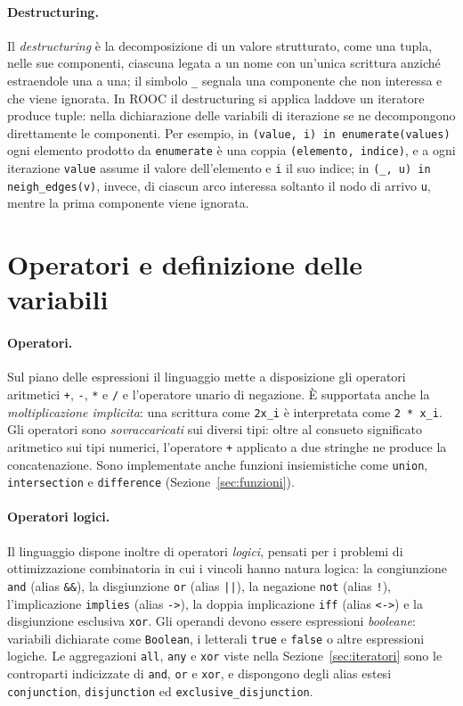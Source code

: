 \paragraph{Destructuring.}
Il \emph{destructuring} è la decomposizione di un valore strutturato, come una
tupla, nelle sue componenti, ciascuna legata a un nome con un'unica scrittura
anziché estraendole una a una; il simbolo \texttt{\_} segnala una componente che
non interessa e che viene ignorata. In ROOC il destructuring si applica laddove un
iteratore produce tuple: nella dichiarazione delle variabili di iterazione se ne
decompongono direttamente le componenti. Per esempio, in \texttt{(value, i) in
enumerate(values)} ogni elemento prodotto da \texttt{enumerate} è una coppia
\texttt{(elemento, indice)}, e a ogni iterazione \texttt{value} assume il valore
dell'elemento e \texttt{i} il suo indice; in \texttt{(\_, u) in neigh\_edges(v)},
invece, di ciascun arco interessa soltanto il nodo di arrivo \texttt{u}, mentre la
prima componente viene ignorata.

\section{Operatori e definizione delle variabili}
\label{sec:operatori-variabili}

\paragraph{Operatori.}
Sul piano delle espressioni il linguaggio mette a disposizione gli operatori
aritmetici \texttt{+}, \texttt{-}, \texttt{*} e \texttt{/} e l'operatore unario
di negazione. È supportata anche la \emph{moltiplicazione implicita}: una
scrittura come \texttt{2x\_i} è interpretata come \texttt{2 * x\_i}. Gli
operatori sono \emph{sovraccaricati} sui diversi tipi: oltre al consueto
significato aritmetico sui tipi numerici, l'operatore \texttt{+} applicato a due
stringhe ne produce la concatenazione. Sono implementate anche funzioni insiemistiche come
\texttt{union}, \texttt{intersection} e \texttt{difference}
(Sezione~\ref{sec:funzioni}).

\paragraph{Operatori logici.}
Il linguaggio dispone inoltre di operatori \emph{logici}, pensati per i problemi
di ottimizzazione combinatoria in cui i vincoli hanno natura logica: la
congiunzione \texttt{and} (alias \texttt{\&\&}), la disgiunzione \texttt{or}
(alias \texttt{||}), la negazione \texttt{not} (alias \texttt{!}),
l'implicazione \texttt{implies} (alias \texttt{->}), la doppia implicazione
\texttt{iff} (alias \texttt{<->}) e la disgiunzione esclusiva \texttt{xor}. Gli
operandi devono essere espressioni \emph{booleane}: variabili dichiarate come
\texttt{Boolean}, i letterali \texttt{true} e \texttt{false} o altre
espressioni logiche.
Le aggregazioni \texttt{all}, \texttt{any} e \texttt{xor} viste nella
Sezione~\ref{sec:iteratori} sono le controparti indicizzate di \texttt{and},
\texttt{or} e \texttt{xor}, e
dispongono degli alias estesi \texttt{conjunction}, \texttt{disjunction} ed
\texttt{exclusive\_disjunction}.

